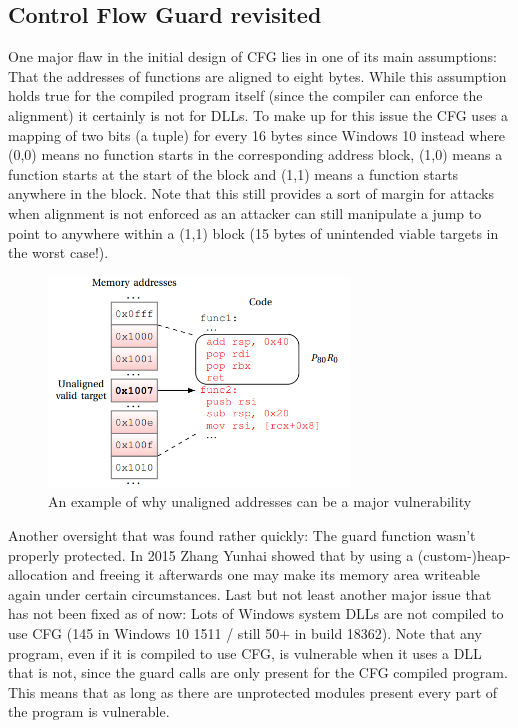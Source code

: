 \documentclass[10pt,twocolumn,a4paper]{article}
\begin{document}
\subsection{Control Flow Guard revisited}
One major flaw in the initial design of CFG lies in one of its main assumptions: That the addresses of functions are aligned to eight bytes.
While this assumption holds true for the compiled program itself (since the compiler can enforce the alignment) it certainly is not for DLLs.
To make up for this issue the CFG uses a mapping of two bits (a tuple) for every 16 bytes since Windows 10 instead where (0,0) means no function starts in the corresponding address block, (1,0) means a function starts at the start of the block and (1,1) means a function starts anywhere in the block.
Note that this still provides a sort of margin for attacks when alignment is not enforced as an attacker can still manipulate a jump to point to anywhere within a (1,1) block (15 bytes of unintended viable targets in the worst case!).
\begin{figure}[h]
	\includegraphics[keepaspectratio,width=8cm]{fig/cfgunallignedcode}
	\caption{An example of why unaligned addresses can be a major vulnerability\cite{cfgexplore}}
\end{figure}
\newpage
Another oversight that was found rather quickly: The guard function wasn't properly protected.
In 2015 Zhang Yunhai showed that by using a \newline(custom-)heap-allocation and freeing it afterwards one may make its memory area writeable again under certain circumstances.\cite{cfgbypass}
\newline Last but not least another major issue that has not been fixed as of now:
Lots of Windows system DLLs are not compiled to use CFG (145 in Windows 10 1511 / still 50+ in build 18362).\cite{cfgbypass2}
\newline Note that any program, even if it is compiled to use CFG, is vulnerable when it uses a DLL that is not, since the guard calls are only present for the CFG compiled program.
This means that as long as there are unprotected modules present every part of the program is vulnerable.
\end{document}
